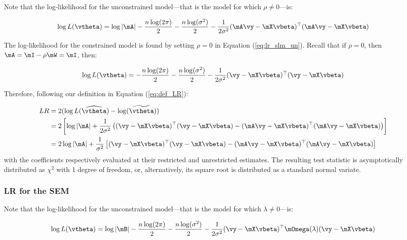 \documentclass[english,12pt]{book}\usepackage[]{graphicx}\usepackage[]{xcolor}
\begin{document}
Note that the log-likelihood for the unconstrained model---that is the model for which $\rho \neq  0$---is:

\begin{equation}\label{eq:lr_slm_un}
\log L(\vtheta) = \log\left| \mA\right| - \frac{n\log(2\pi)}{2} - \frac{n\log(\sigma^2)}{2} - \frac{1}{2\sigma^2}(\mA\vy-\mX\vbeta)^\top(\mA\vy-\mX\vbeta) 
\end{equation}

The log-likelihood for the constrained model is found by setting $\rho = 0$ in Equation (\ref{eq:lr_slm_un}). Recall that if $\rho = 0$, then $\mA = \mI - \rho\mW = \mI$, then: 

\begin{equation}
\log L(\vtheta) =  - \frac{n\log(2\pi)}{2} - \frac{n\log(\sigma^2)}{2} - \frac{1}{2\sigma^2}(\vy-\mX\vbeta)^\top (\vy-\mX\vbeta) 
\end{equation}

Therefore, following our definition in Equation (\ref{eq:def_LR}): 

\begin{equation}
  \begin{aligned}
LR  & = 2 (\log L(\widehat{\vtheta}) - \log (\widetilde{\vtheta})) \\
    & = 2\left[\log\left| \mA\right| + \frac{1}{2\sigma^2}\left((\vy-\mX\vbeta)^\top (\vy-\mX\vbeta) - (\mA\vy-\mX\vbeta)^\top(\mA\vy-\mX\vbeta) \right) \right] \\
    & = 2\log\left| \mA\right| + \frac{1}{\sigma^2}\left[(\vy-\mX\vbeta)^\top (\vy-\mX\vbeta) - (\mA\vy-\mX\vbeta)^\top(\mA\vy-\mX\vbeta) \right]
\end{aligned}
\end{equation}
%
with the coefficients respectively evaluated at their restricted and unrestricted estimates. The resulting test statistic is asymptotically distributed as $\chi^2$ with 1 degree of freedom, or, alternatively, its square root is distributed as a standard normal variate.

\subsubsection{LR for the SEM}

Note that the log-likelihood for the unconstrained model---that is the model for which $\lambda \neq  0$---is:

\begin{equation}\label{eq:lr_sem_un}
\log L(\vtheta) = \log\left| \mB\right| - \frac{n\log(2\pi)}{2} - \frac{n\log(\sigma^2)}{2} - \frac{1}{2\sigma^2}(\vy-\mX\vbeta)^\top\mOmega(\lambda)(\vy-\mX\vbeta) 
\end{equation}
\end{document}
